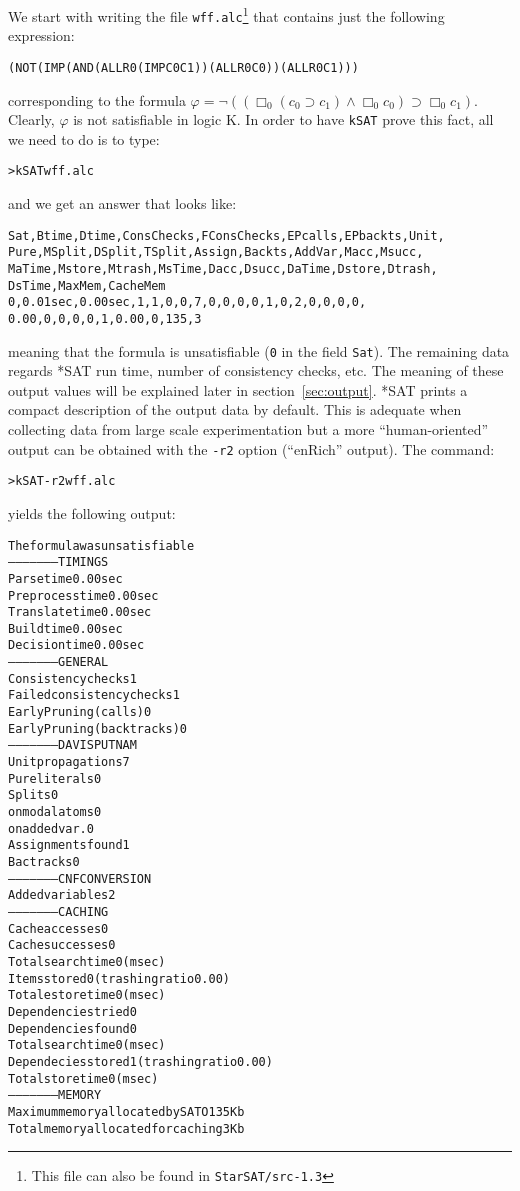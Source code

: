 \documentclass[12pt]{report}
\begin{document}
We start with writing 
the file {\tt wff.alc}\footnote{%
This file can also be found in {\tt StarSAT/src-1.3}}
that contains just the following expression:
\begin{alltt}
\footnotesize
(NOT (IMP (AND (ALL R0 (IMP C0 C1)) (ALL R0 C0)) (ALL R0 C1)))
\end{alltt}
corresponding to the formula $\varphi = \neg(( \Box_0 (c_0 \supset c_1) \wedge \Box_0
c_0) \supset \Box_0 c_1)$. Clearly, $\varphi$ is not satisfiable in
logic K. In order to have  {\tt kSAT} prove this fact, all we need to
do is to type:
\begin{alltt}
\footnotesize
>kSAT wff.alc
\end{alltt}
and we get an answer that looks like:
\begin{alltt}
\footnotesize
Sat, Btime, Dtime, ConsChecks, FConsChecks, EPcalls, EPbackts, Unit,
Pure, MSplit, DSplit, TSplit, Assign, Backts, AddVar, Macc, Msucc, 
MaTime, Mstore, Mtrash, MsTime, Dacc, Dsucc, DaTime, Dstore, Dtrash, 
DsTime, MaxMem, CacheMem
0, 0.01 sec, 0.00 sec, 1, 1, 0, 0, 7, 0, 0, 0, 0, 1, 0, 2, 0, 0, 0, 0, 
0.00, 0, 0, 0, 0 ,1, 0.00, 0, 135, 3
\end{alltt}
meaning that the formula is unsatisfiable ({\tt 0} in the field {\tt Sat}). The remaining
data regards *SAT run time, number of consistency checks, etc. The
meaning of these output values will be explained later in
section~\ref{sec:output}. *SAT prints a compact description of the output data 
by default. This is adequate when collecting data
from large scale experimentation but a more ``human-oriented'' output can be
obtained with the {\tt -r2} option (``enRich'' output). The command:
\begin{alltt}
\footnotesize
>kSAT -r2 wff.alc
\end{alltt}
yields the following output:
\begin{alltt}
\footnotesize
The formula was unsatisfiable
--------------------TIMINGS
Parse time        0.00 sec
Preprocess time   0.00 sec
Translate time    0.00 sec
Build time        0.00 sec
Decision time     0.00 sec
--------------------GENERAL
Consistency checks         1
Failed consistency checks  1
Early Pruning (calls)      0
Early Pruning (backtracks) 0
--------------------DAVIS PUTNAM
Unit propagations  7
Pure literals      0
Splits             0
  on modal atoms   0
  on added var.    0
Assignments found  1
Bactracks          0
--------------------CNF CONVERSION
Added variables   2
--------------------CACHING
Cache accesses      0
Cache successes     0
Total search time   0 (msec)
Items stored        0 (trashing ratio 0.00)
Totale store time   0 (msec)
Dependencies tried  0
Dependencies found  0
Total search time   0 (msec)
Dependecies stored  1 (trashing ratio 0.00)
Total store time    0 (msec)
--------------------MEMORY
Maximum memory allocated by SATO               135 Kb
Total memory allocated for caching             3 Kb
\end{alltt}
\end{document}
